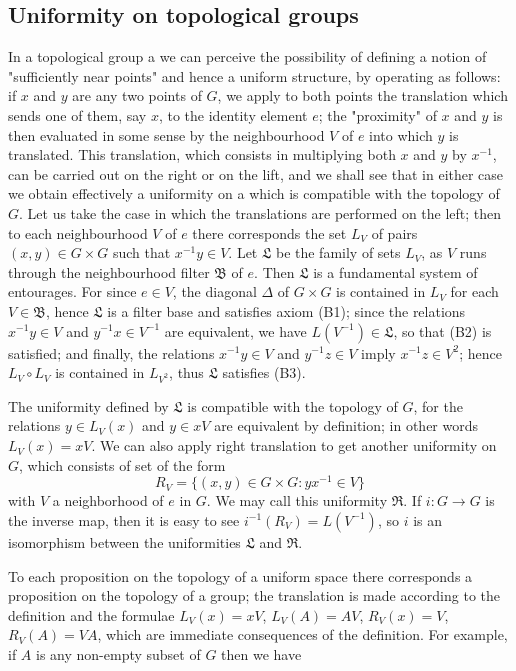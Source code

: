 \subsection{Uniformity on topological groups}
In a topological group a we can perceive the possibility of defining a notion of "sufficiently near points" and hence a uniform structure, by operating as follows: if $x$ and $y$ are any two points of $G$, we apply to both points the translation which sends one of them, say $x$, to the identity element $e$; the "proximity" of $x$ and $y$ is then evaluated in some sense by the neighbourhood $V$ of $e$ into which $y$ is translated. This translation, which consists in multiplying both $x$ and $y$ by $x^{-1}$, can be carried out on the right or on the lift, and we shall see that in either case we obtain effectively a uniformity on a which is compatible with the topology of $G$. Let us take the case in which the translations are performed on the left; then to each neighbourhood $V$ of $e$ there corresponds the set $L_V$ of pairs $(x,y)\in G\times G$ such that $x^{-1}y\in V$. Let $\mathfrak{L}$ be the family of sets $L_V$, as $V$ runs through the neighbourhood filter $\mathfrak{B}$ of $e$. Then $\mathfrak{L}$ is a fundamental system of entourages. For since $e\in V$, the diagonal $\Delta$ of $G\times G$ is contained in $L_V$ for each $V\in\mathfrak{B}$, hence $\mathfrak{L}$ is a filter base and satisfies axiom (B1); since the relations $x^{-1}y\in V$ and $y^{-1}x\in V^{-1}$ are equivalent, we have $L(V^{-1})\in\mathfrak{L}$, so that (B2) is satisfied; and finally, the relations $x^{-1}y\in V$ and $y^{-1}z\in V$ imply $x^{-1}z\in V^2$; hence $L_V\circ L_V$ is contained in $L_{V^2}$, thus $\mathfrak{L}$ satisfies (B3).\par
The uniformity defined by $\mathfrak{L}$ is compatible with the topology of $G$, for the relations $y\in L_V(x)$ and $y\in xV$ are equivalent by definition; in other words $L_V(x)=xV$. We can also apply right translation to get another uniformity on $G$, which consists of set of the form
\[R_V=\{(x,y)\in G\times G:yx^{-1}\in V\}\]
with $V$ a neighborhood of $e$ in $G$. We may call this uniformity $\mathfrak{R}$. If $i:G\to G$ is the inverse map, then it is easy to see $i^{-1}(R_V)=L(V^{-1})$, so $i$ is an isomorphism between the uniformities $\mathfrak{L}$ and $\mathfrak{R}$.\par
To each proposition on the topology of a uniform space there corresponds a proposition on the topology of a group; the translation is made according to the definition and the formulae $L_V(x)=xV$, $L_V(A)=AV$, $R_V(x)=V$, $R_V(A)=VA$, which are immediate consequences of the definition. For example, if $A$ is any non-empty subset of $G$ then we have

